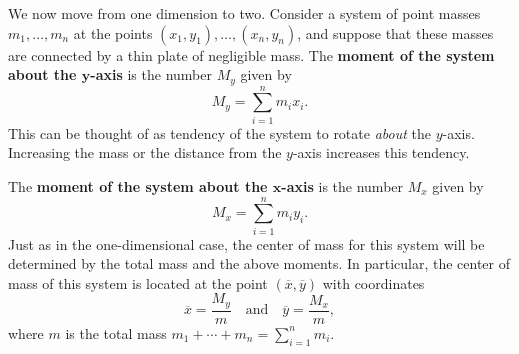 \documentclass[10pt,]{book}
\newcommand{\terminology}[1]{\textbf{#1}}
\numberwithin{equation}{section}
\begin{document}
\begin{figure}
\centering
{
}
\end{figure}
\hypertarget{p-698}{}%
We now move from one dimension to two. Consider a system of point masses \(m_{1},\ldots,m_{n}\) at the points \((x_{1},y_{1}),\ldots,(x_{n},y_{n})\), and suppose that these masses are connected by a thin plate of negligible mass. The \terminology{moment of the system about the \(\boldsymbol{y}\)-axis} is the number \(M_{y}\) given by%
%
\begin{equation*}
M_{y} = \sum_{i=1}^{n}m_{i}x_{i}.
\end{equation*}
\hypertarget{p-699}{}%
This can be thought of as tendency of the system to rotate \emph{about} the \(y\)-axis. Increasing the mass or the distance from the \(y\)-axis increases this tendency.%
\par
\hypertarget{p-700}{}%
The \terminology{moment of the system about the \(\boldsymbol{x}\)-axis} is the number \(M_{x}\) given by%
\begin{equation*}
M_{x} = \sum_{i=1}^{n}m_{i}y_{i}.
\end{equation*}
Just as in the one-dimensional case, the center of mass for this system will be determined by the total mass and the above moments. In particular, the center of mass of this system is located at the point \((\overline{x},\overline{y})\) with coordinates%
\begin{equation*}
\overline{x} = \frac{M_{y}}{m}\quad\text{and}\quad\overline{y} = \frac{M_{x}}{m},
\end{equation*}
where \(m\) is the total mass \(m_{1}+\cdots+m_{n} = \sum_{i=1}^{n}m_{i}\).%
\end{document}
